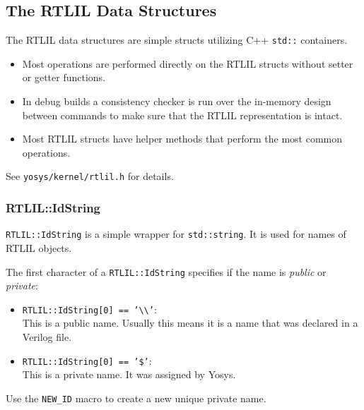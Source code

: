 
\subsection{The RTLIL Data Structures}

\begin{frame}{\subsecname}
The RTLIL data structures are simple structs utilizing C++ {\tt std::}
containers.

\bigskip
\begin{itemize}
\item Most operations are performed directly on the RTLIL structs without
setter or getter functions.

\bigskip
\item In debug builds a consistency checker is run over the in-memory design
between commands to make sure that the RTLIL representation is intact.

\bigskip
\item Most RTLIL structs have helper methods that perform the most common operations.
\end{itemize}

\bigskip
See {\tt yosys/kernel/rtlil.h} for details.
\end{frame}

\subsubsection{RTLIL::IdString}

\begin{frame}{\subsubsecname}{}
{\tt RTLIL::IdString} is a simple wrapper for {\tt std::string}. It is used for names of RTLIL objects.

\medskip
The first character of a {\tt RTLIL::IdString} specifies if the name is {\it public\/} or {\it private\/}:

\medskip
\begin{itemize}
\item {\tt RTLIL::IdString[0] == '\textbackslash\textbackslash'}: \\
This is a public name. Usually this means it is a name that was declared in a Verilog file.

\bigskip
\item {\tt RTLIL::IdString[0] == '\$'}: \\
This is a private name. It was assigned by Yosys.
\end{itemize}

\bigskip
Use the {\tt NEW\_ID} macro to create a new unique private name.
\end{frame}

